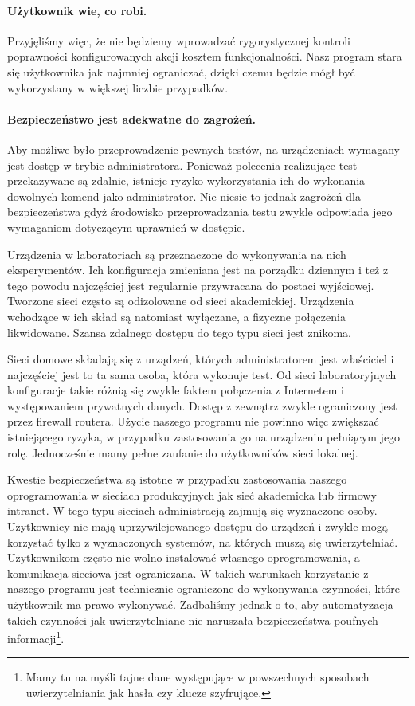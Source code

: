 \documentclass[00-praca-magisterska.tex]{subfiles}
\begin{document}
\paragraph{Użytkownik wie, co robi.} Przyjęliśmy więc, że nie będziemy
wprowadzać rygorystycznej kontroli poprawności konfigurowanych akcji kosztem
funkcjonalności. Nasz program stara się użytkownika jak najmniej ograniczać,
dzięki czemu będzie mógł być wykorzystany w większej liczbie przypadków.

\paragraph{Bezpieczeństwo jest adekwatne do zagrożeń.} Aby możliwe było
przeprowadzenie pewnych testów, na urządzeniach wymagany jest dostęp w trybie
administratora. Ponieważ polecenia realizujące test przekazywane są zdalnie,
istnieje ryzyko wykorzystania ich do wykonania dowolnych komend jako
administrator. Nie niesie to jednak zagrożeń dla bezpieczeństwa gdyż środowisko
przeprowadzania testu zwykle odpowiada jego wymaganiom dotyczącym uprawnień w
dostępie.

Urządzenia w laboratoriach są przeznaczone do wykonywania na nich eksperymentów.
Ich konfiguracja zmieniana jest na porządku dziennym i też z tego powodu
najczęściej jest regularnie przywracana do postaci wyjściowej. Tworzone sieci
często są odizolowane od sieci akademickiej. Urządzenia wchodzące w ich skład są
natomiast wyłączane, a fizyczne połączenia likwidowane. Szansa zdalnego dostępu
do tego typu sieci jest znikoma.

Sieci domowe składają się z urządzeń, których administratorem jest właściciel i
najczęściej jest to ta sama osoba, która wykonuje test. Od sieci laboratoryjnych
konfiguracje takie różnią się zwykle faktem połączenia z Internetem i
występowaniem prywatnych danych. Dostęp z zewnątrz zwykle ograniczony jest przez
firewall routera. Użycie naszego programu nie powinno więc zwiększać
istniejącego ryzyka, w przypadku zastosowania go na urządzeniu pełniącym jego
rolę. Jednocześnie mamy pełne zaufanie do użytkowników sieci lokalnej.

Kwestie bezpieczeństwa są istotne w przypadku zastosowania naszego
oprogramowania w sieciach produkcyjnych jak sieć akademicka lub firmowy
intranet. W tego typu sieciach administracją zajmują się wyznaczone osoby.
Użytkownicy nie mają uprzywilejowanego dostępu do urządzeń i zwykle mogą
korzystać tylko z wyznaczonych systemów, na których muszą się uwierzytelniać.
Użytkownikom często nie wolno instalować własnego oprogramowania, a komunikacja
sieciowa jest ograniczana. W takich warunkach korzystanie z naszego programu
jest technicznie ograniczone do wykonywania czynności, które użytkownik ma prawo
wykonywać. Zadbaliśmy jednak o to, aby automatyzacja takich czynności jak
uwierzytelniane nie naruszała bezpieczeństwa poufnych informacji\footnote{Mamy
tu na myśli tajne dane występujące w powszechnych sposobach uwierzytelniania jak
hasła czy klucze szyfrujące.}.
\end{document}
